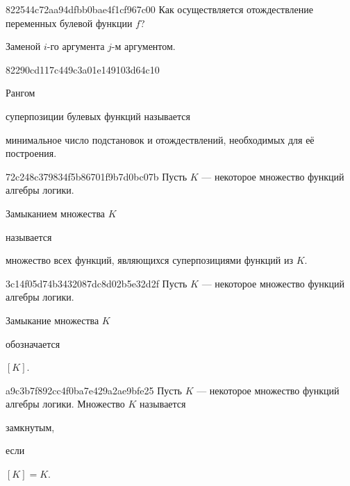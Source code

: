 \begin{note}{822544c72aa94dfbb0bae4f1cf967c00}
    Как осуществляется отождествление переменных булевой функции \({ f }\)?

    \begin{cloze}{1}
        Заменой \({ i }\)-го аргумента \({ j }\)-м аргументом.
    \end{cloze}
\end{note}

\begin{note}{82290cd117c449c3a01e149103d64c10}
    \begin{icloze}{2}Рангом\end{icloze} суперпозиции булевых функций называется \begin{icloze}{1}минимальное число подстановок и отождествлений, необходимых для её построения.\end{icloze}
\end{note}

\begin{note}{72c248c379834f5b86701f9b7d0bc07b}
    Пусть \({ K }\) --- некоторое множество функций алгебры логики.
    \begin{icloze}{2}Замыканием множества \({ K }\)\end{icloze} называется \begin{icloze}{1}множество всех функций, являющихся суперпозициями функций из \({ K }\).\end{icloze}
\end{note}

\begin{note}{3c14f05d74b3432087dc8d02b5e32d2f}
    Пусть \({ K }\) --- некоторое множество функций алгебры логики.
    \begin{icloze}{2}Замыкание множества \({ K }\)\end{icloze} обозначается \begin{icloze}{1}\({ \left[ K \right] }\).\end{icloze}
\end{note}

\begin{note}{a9c3b7f892cc4f0ba7e429a2ae9bfe25}
    Пусть \({ K }\) --- некоторое множество функций алгебры логики.
    Множество \({ K }\) называется \begin{icloze}{2}замкнутым,\end{icloze} если \begin{icloze}{1}\({ [K] = K }\).\end{icloze}
\end{note}

